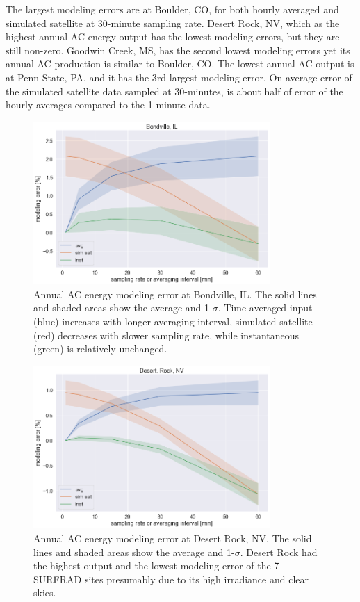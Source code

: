 \documentclass[conference]{IEEEtran}
\begin{document}
The largest modeling errors are at Boulder, CO, for both hourly averaged and simulated satellite at 30-minute sampling rate. Desert Rock, NV, which as the highest annual AC energy output has the lowest modeling errors, but they are still non-zero. Goodwin Creek, MS, has the second lowest modeling errors yet its annual AC production is similar to Boulder, CO. The lowest annual AC output is at Penn State, PA, and it has the 3rd largest modeling error. On average error of the simulated satellite data sampled at 30-minutes, is about half of error of the hourly averages compared to the 1-minute data.

\begin{figure}[htbp]
\centerline{\includegraphics[width=9cm]{analysis/bon_all.png}}
\caption{Annual AC energy modeling error at Bondville, IL. The solid lines and shaded areas show the average and 1-$\sigma$. Time-averaged input (blue) increases with longer averaging interval, simulated satellite (red) decreases with slower sampling rate, while instantaneous (green) is relatively unchanged.}
\label{fig:bon2010}
\end{figure}

\begin{figure}[htbp]
\centerline{\includegraphics[width=9cm]{analysis/dra_all.png}}
\caption{Annual AC energy modeling error at Desert Rock, NV. The solid lines and shaded areas show the average and 1-$\sigma$. Desert Rock had the highest output and the lowest modeling error of the 7 SURFRAD sites presumably due to its high irradiance and clear skies.}
\label{fig:dra2011}
\end{figure}
\end{document}
